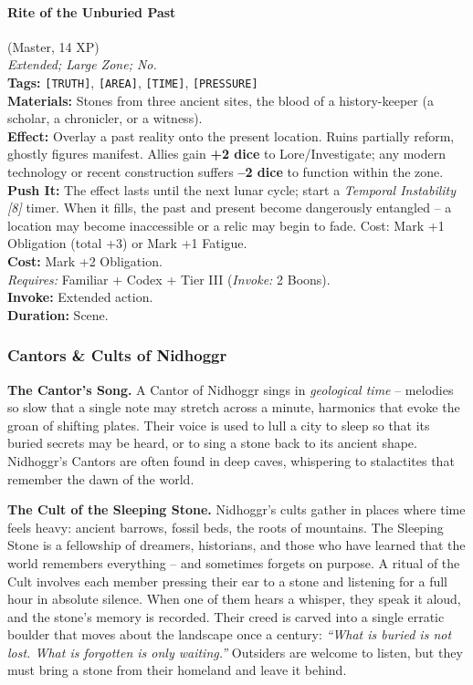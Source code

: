 \paragraph{Rite of the Unburied Past} (Master, 14 XP) \hfill \\
\emph{Extended; Large Zone; No.} \\
\textbf{Tags:} \texttt{[TRUTH]}, \texttt{[AREA]}, \texttt{[TIME]}, \texttt{[PRESSURE]} \\
\textbf{Materials:} Stones from three ancient sites, the blood of a history-keeper (a scholar, a chronicler, or a witness). \\
\textbf{Effect:} Overlay a past reality onto the present location. Ruins partially reform, ghostly figures manifest. Allies gain \textbf{+2 dice} to Lore/Investigate; any modern technology or recent construction suffers \textbf{--2 dice} to function within the zone. \\
\textbf{Push It:} The effect lasts until the next lunar cycle; start a \textit{Temporal Instability [8]} timer. When it fills, the past and present become dangerously entangled -- a location may become inaccessible or a relic may begin to fade. Cost: Mark +1 Obligation (total +3) or Mark +1 Fatigue. \\
\textbf{Cost:} Mark +2 Obligation. \\
\textit{Requires:} Familiar + Codex + Tier III (\textit{Invoke:} 2 Boons). \\
\textbf{Invoke:} Extended action. \\
\textbf{Duration:} Scene.

\subsubsection*{Cantors \& Cults of Nidhoggr}

\textbf{The Cantor's Song.} A Cantor of Nidhoggr sings in \textit{geological time} -- melodies so slow that a single note may stretch across a minute, harmonics that evoke the groan of shifting plates. Their voice is used to lull a city to sleep so that its buried secrets may be heard, or to sing a stone back to its ancient shape. Nidhoggr's Cantors are often found in deep caves, whispering to stalactites that remember the dawn of the world.

\textbf{The Cult of the Sleeping Stone.} Nidhoggr's cults gather in places where time feels heavy: ancient barrows, fossil beds, the roots of mountains. The Sleeping Stone is a fellowship of dreamers, historians, and those who have learned that the world remembers everything -- and sometimes forgets on purpose. A ritual of the Cult involves each member pressing their ear to a stone and listening for a full hour in absolute silence. When one of them hears a whisper, they speak it aloud, and the stone's memory is recorded. Their creed is carved into a single erratic boulder that moves about the landscape once a century: \textit{``What is buried is not lost. What is forgotten is only waiting.''} Outsiders are welcome to listen, but they must bring a stone from their homeland and leave it behind.

